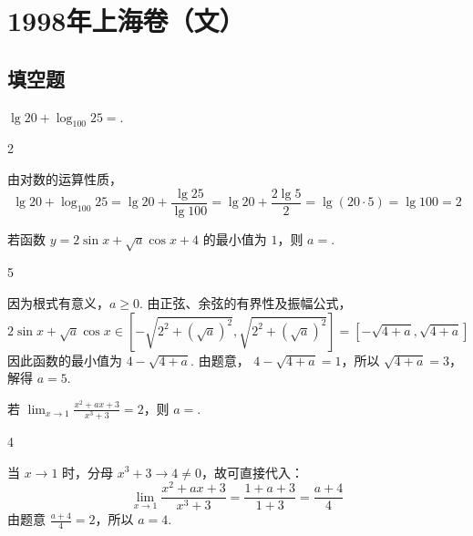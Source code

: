 \documentclass[UTF8,a4paper,oneside,11pt]{ctexbook}
\begin{document}
\mainmatter

\chapter{1998年上海卷（文）}
\section{填空题}

\begin{problem}
\(\lg20 + \log_{100}25 = \)\fillinblank{}.
\end{problem}

\begin{answer}
2
\end{answer}

\begin{solution}
由对数的运算性质，
\[
\lg20+\log_{100}25=\lg20+\frac{\lg25}{\lg100}=\lg20+\frac{2\lg5}{2}=\lg(20\cdot5)=\lg100=2
\]
\end{solution}

\begin{problem}
若函数 \(y = 2\sin x + \sqrt{a} \cos x + 4 \) 的最小值为 \(1\)，则 \(a=\)\fillinblank{}.
\end{problem}

\begin{answer}
5
\end{answer}

\begin{solution}
因为根式有意义，\(a\geqslant0\). 由正弦、余弦的有界性及振幅公式，
\[
2\sin x+\sqrt a\cos x\in\left[-\sqrt{2^2+(\sqrt a)^2},\sqrt{2^2+(\sqrt a)^2}\right]=\left[-\sqrt{4+a},\sqrt{4+a}\right]
\]
因此函数的最小值为 \(4-\sqrt{4+a}\). 由题意，
\(4-\sqrt{4+a}=1\)，所以 \(\sqrt{4+a}=3\)，解得 \(a=5\).
\end{solution}

\begin{problem}
若 \(\displaystyle\lim_{x\to1}\frac{x^{2}+ax+3}{x^{3}+3}=2 \)，则 \(a=\)\fillinblank{}.
\end{problem}

\begin{answer}
4
\end{answer}

\begin{solution}
当 \(x\to1\) 时，分母 \(x^3+3\to4\ne0\)，故可直接代入：
\[
\lim_{x\to1}\frac{x^2+ax+3}{x^3+3}=\frac{1+a+3}{1+3}=\frac{a+4}{4}
\]
由题意 \(\frac{a+4}{4}=2\)，所以 \(a=4\).
\end{solution}
\end{document}
